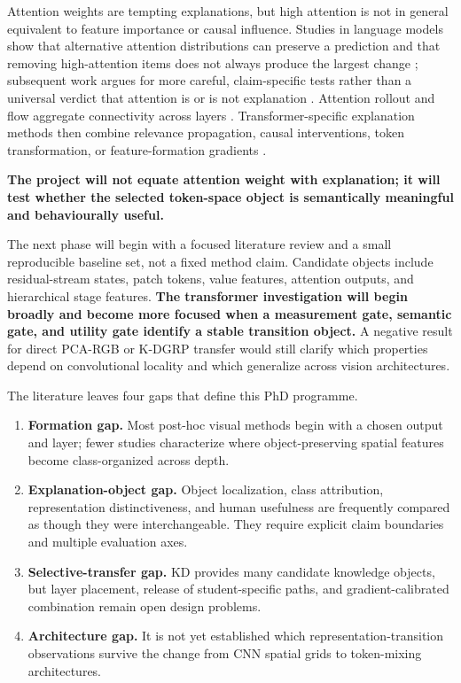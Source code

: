 Attention weights are tempting explanations, but high attention is not in
general equivalent to feature importance or causal influence. Studies in
language models show that alternative attention distributions can preserve a
prediction and that removing high-attention items does not always produce the
largest change \cite{jain2019attention,serrano2019attention}; subsequent work
argues for more careful, claim-specific tests rather than a universal verdict
that attention is or is not explanation \cite{wiegreffe2019attention}.
Attention rollout and flow aggregate connectivity across layers
\cite{abnar2020attentionflow}. Transformer-specific explanation methods then
combine relevance propagation, causal interventions, token transformation, or
feature-formation gradients
\cite{chefer2021transformer,xie2023vitcx,wu2024tokentm,
mehri2025libragrad,bousselham2025legrad}.

\textbf{The project will not equate attention weight with explanation; it will
test whether the selected token-space object is semantically meaningful and
behaviourally useful.}

The next phase will begin with a focused literature review and a
small reproducible baseline set, not a fixed method claim. Candidate objects
include residual-stream states, patch tokens, value features, attention
outputs, and hierarchical stage features. \textbf{The transformer investigation
will begin broadly and become more focused when a measurement gate, semantic
gate, and utility gate identify a stable transition object.} A negative result
for direct PCA-RGB or
K-DGRP transfer would still clarify which properties depend on convolutional
locality and which generalize across vision architectures.

The literature leaves four gaps that define this PhD programme.

\begin{enumerate}[leftmargin=*]
    \item \textbf{Formation gap.} Most post-hoc visual methods begin with a
    chosen output and layer; fewer studies characterize where object-preserving
    spatial features become class-organized across depth.
    \item \textbf{Explanation-object gap.} Object localization, class
    attribution, representation distinctiveness, and human usefulness are
    frequently compared as though they were interchangeable. They require
    explicit claim boundaries and multiple evaluation axes.
    \item \textbf{Selective-transfer gap.} KD provides many candidate
    knowledge objects, but layer placement, release of student-specific paths,
    and gradient-calibrated combination remain open design problems.
    \item \textbf{Architecture gap.} It is not yet established which
    representation-transition observations survive the change from CNN spatial
    grids to token-mixing architectures.
\end{enumerate}

